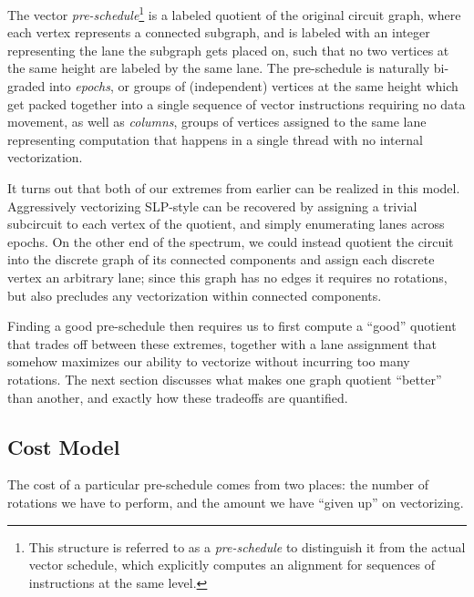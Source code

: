 The vector {\em pre-schedule}\footnote{This structure is referred to as a {\em pre-schedule} to distinguish it from the actual vector schedule, which explicitly computes an alignment for sequences of instructions at the same level. %
} is a labeled quotient of the original circuit graph, where each vertex represents a connected subgraph, and is labeled with an integer representing the lane the subgraph gets placed on, such that no two vertices at the same height are labeled by the same lane.
The pre-schedule is naturally bi-graded into {\em epochs}, or groups of (independent) vertices at the same height which get packed together into a single sequence of vector instructions requiring no data movement, as well as {\em columns}, groups of vertices assigned to the same lane representing computation that happens in a single thread with no internal vectorization.

It turns out that both of our extremes from earlier can be realized in this model.
Aggressively vectorizing SLP-style can be recovered by assigning a trivial subcircuit to each vertex of the quotient, and simply enumerating lanes across epochs.
On the other end of the spectrum, we could instead quotient the circuit into the discrete graph of its connected components and assign each discrete vertex an arbitrary lane; since this graph has no edges it requires no rotations, but also precludes any vectorization within connected components.

Finding a good pre-schedule then requires us to first compute a ``good'' quotient that trades off between these extremes, together with a lane assignment that somehow maximizes our ability to vectorize without incurring too many rotations.
The next section discusses what makes one graph quotient ``better'' than another, and exactly how these tradeoffs are quantified.

\subsection{Cost Model}\label{sec:cost-model}
The cost of a particular pre-schedule comes from two places: the number of rotations we have to perform, and the amount we have ``given up'' on vectorizing.
